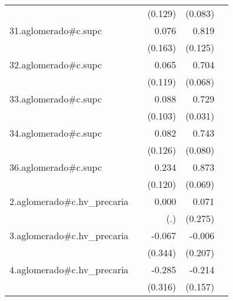 {\begin{longtable}{l*{4}{D{.}{.}{-1}}}
            &                     &     (0.129)         &     (0.083)         &                     \\
\addlinespace
31.aglomerado#c.supc&                     &       0.076         &       0.819\sym{***}&                     \\
            &                     &     (0.163)         &     (0.125)         &                     \\
\addlinespace
32.aglomerado#c.supc&                     &       0.065         &       0.704\sym{***}&                     \\
            &                     &     (0.119)         &     (0.068)         &                     \\
\addlinespace
33.aglomerado#c.supc&                     &       0.088         &       0.729\sym{***}&                     \\
            &                     &     (0.103)         &     (0.031)         &                     \\
\addlinespace
34.aglomerado#c.supc&                     &       0.082         &       0.743\sym{***}&                     \\
            &                     &     (0.126)         &     (0.080)         &                     \\
\addlinespace
36.aglomerado#c.supc&                     &       0.234         &       0.873\sym{***}&                     \\
            &                     &     (0.120)         &     (0.069)         &                     \\
\addlinespace
2.aglomerado#c.hv\_precaria&                     &       0.000         &       0.071         &                     \\
            &                     &         (.)         &     (0.275)         &                     \\
\addlinespace
3.aglomerado#c.hv\_precaria&                     &      -0.067         &      -0.006         &                     \\
            &                     &     (0.344)         &     (0.207)         &                     \\
\addlinespace
4.aglomerado#c.hv\_precaria&                     &      -0.285         &      -0.214         &                     \\
            &                     &     (0.316)         &     (0.157)         &                     \\

\end{longtable}}
